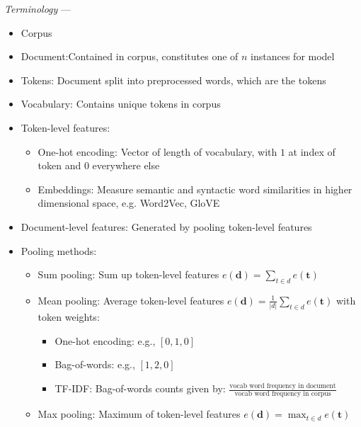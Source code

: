 \emph{Terminology} --- 
\begin{itemize}
    \item Corpus
    \item Document:Contained in corpus, constitutes one of $n$ instances for model
    \item Tokens: Document split into preprocessed words, which are the tokens
    \item Vocabulary: Contains unique tokens in corpus
    \item Token-level features: 
    \begin{itemize}
        \item One-hot encoding: Vector of length of vocabulary, with $1$ at index of token and $0$ everywhere else
        \item Embeddings: Measure semantic and syntactic word similarities in higher dimensional space, e.g. Word2Vec, GloVE
    \end{itemize}
    \item Document-level features: Generated by pooling token-level features
    \item Pooling methods:
    \begin{itemize}
        \item Sum pooling: Sum up token-level features $e(\boldsymbol{d}) = \sum_{t \in d} e(\boldsymbol{t})$
        \item Mean pooling: Average token-level features $e(\boldsymbol{d}) = \frac{1}{|d|} \sum_{t \in d} e(\boldsymbol{t})$ with token weights:
        \begin{itemize}
            \item One-hot encoding: e.g., $[0, 1, 0]$
            \item Bag-of-words: e.g., $[1, 2, 0]$
            \item TF-IDF: Bag-of-words counts given by: $\frac{\textrm{vocab word frequency in document}}{\textrm{vocab word frequency in corpus}}$
        \end{itemize}
        \item Max pooling: Maximum of token-level features $e(\boldsymbol{d}) = \max_{t \in d} e(\boldsymbol{t})$
    \end{itemize}
\end{itemize}
